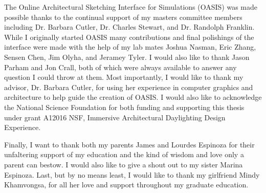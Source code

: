 

The Online Architectural Sketching Interface for Simulations (OASIS) was made possible thanks to the continual support of my masters committee members including Dr. Barbara Cutler, Dr. Charles Stewart, and Dr. Randolph Franklin.
While I originally started OASIS many contributions and final polishings of the interface were made with the help of my lab mates Joshua Nasman, Eric Zhang, Sensen Chen, Jim Olyha, and Jeramey Tyler. I would also like to thank Jason Parham and Jon Crall, both of which were always  available to answer any question I could throw at them. Most importantly, I would like to thank my advisor, Dr. Barbara Cutler, for using her experience in computer graphics and architecture to help guide the creation of OASIS. I would also like to acknowledge the National Science Foundation for both funding and supporting this thesis under grant A12016 NSF, Immersive Architectural Daylighting Design Experience.

Finally, I want to thank both my parents James and Lourdes Espinoza for their unfaltering support of my education and the kind of wisdom and love only a parent can bestow. 
I would also like to give a shout out to my sister Marina Espinoza.
Last, but by no means least, I would like to thank my girlfriend Mindy Khamvongsa, for all her love and support throughout my graduate education.


